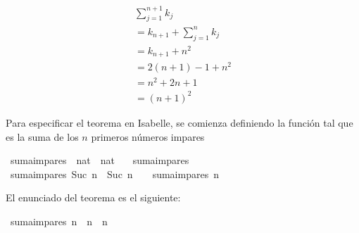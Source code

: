\begin{isabellebody}
\begin{isamarkuptext}
\begin{demostracion}
    $$\begin{array}{l}
      \sum_{j = 1}^{n+1} k_j \\
      = k_{n+1} + \sum^{n}_{j=1} k_j \\ 
      = k_{n+1} + n^2 \\
      = 2(n+1) - 1 + n^2 \\
      = n^2 + 2n + 1 \\ 
      = (n+1)^2
      \end{array}$$ 
  \end{demostracion}%
\end{isamarkuptext}\isamarkuptrue%
%
\isadelimdocument
%
\endisadelimdocument
%
\isatagdocument
%
\isamarkuptrue%
%
\endisatagdocument
{\isafolddocument}%
%
\isadelimdocument
%
\endisadelimdocument
%
\begin{isamarkuptext}%
Para especificar el teorema en Isabelle, se comienza definiendo 
  la función  tal que  es
  la suma de los $n$ primeros números impares%
\end{isamarkuptext}\isamarkuptrue%
\isamarkupfalse%
\ suma{\isacharunderscore}impares\ {\isacharcolon}{\isacharcolon}\ {\isachardoublequoteopen}nat\ {\isasymRightarrow}\ nat{\isachardoublequoteclose}\ \isanewline
\ \ {\isachardoublequoteopen}suma{\isacharunderscore}impares\ {}\ {\isacharequal}\ {}{\isachardoublequoteclose}\ \isanewline
{\isacharbar}\ {\isachardoublequoteopen}suma{\isacharunderscore}impares\ {\isacharparenleft}Suc\ n{\isacharparenright}\ {\isacharequal}\ {\isacharparenleft}{}{\isacharasterisk}{\isacharparenleft}Suc\ n{\isacharparenright}\ {\isacharminus}\ {}{\isacharparenright}\ {\isacharplus}\ suma{\isacharunderscore}impares\ n{\isachardoublequoteclose}%
\begin{isamarkuptext}%
El enunciado del teorema es el siguiente:%
\end{isamarkuptext}\isamarkuptrue%
\isamarkupfalse%
\ {\isachardoublequoteopen}suma{\isacharunderscore}impares\ n\ {\isacharequal}\ n\ {\isacharasterisk}\ n{\isachardoublequoteclose}\isanewline
%
\isadelimproof
%
\endisadelimproof
%
\isatagproof
{}\isamarkupfalse%
%
\endisatagproof
{\isafoldproof}%
%
\isadelimproof
%
\endisadelimproof
%
\isadelimdocument
%
\endisadelimdocument
%
\isatagdocument
%
\isamarkuptrue%
%
\endisatagdocument
{\isafolddocument}%

\end{isabellebody}
